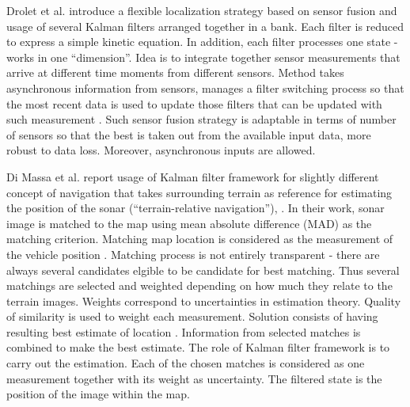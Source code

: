 Drolet et al. \cite{drolet00} introduce a flexible localization strategy based on sensor fusion and usage of several Kalman filters arranged together in a bank. Each filter is reduced to express a simple kinetic equation. In addition, each filter processes one state - works in one ``dimension''. Idea is to integrate together sensor measurements that arrive at different time moments from different sensors. Method takes asynchronous information from sensors, manages a filter switching process so that the most recent data is used to update those filters that can be updated with such measurement \cite{drolet00}. Such sensor fusion strategy is adaptable in terms of number of sensors so that the best is taken out from the available input data, more robust to data loss. Moreover, asynchronous inputs are allowed. 

Di Massa et al. report usage of Kalman filter framework for slightly different concept of navigation that takes surrounding terrain as reference for estimating the position of the sonar (``terrain-relative navigation''), \cite{diMassa97}. In their work, sonar image is matched to the map using mean absolute difference (MAD) as the matching criterion. Matching map location is considered as the measurement of the vehicle position \cite{diMassa97}. Matching process is not entirely transparent - there are always several candidates elgible to be candidate for best matching. Thus several matchings are selected and weighted depending on how much they relate to the terrain images. Weights correspond to uncertainties in estimation theory. Quality of similarity is used to weight each measurement. Solution consists of having resulting best estimate of location \cite{diMassa97}. Information from selected matches is combined to make the best estimate. The role of Kalman filter framework is to carry out the estimation. Each of the chosen matches is considered as one measurement together with its weight as uncertainty. The filtered state is the position of the image within the map. 

